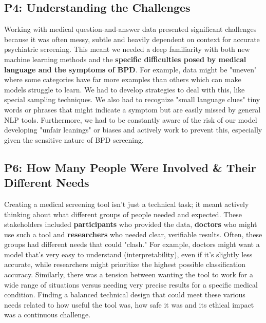 \subsection{P4: Understanding the Challenges}
Working with medical question-and-answer data presented significant challenges because it was often messy, subtle and heavily dependent on context for accurate psychiatric screening. This meant we needed a deep familiarity with both new machine learning methods and the \textbf{specific difficulties posed by medical language and the symptoms of BPD}. For example, data might be "uneven" where some categories have far more examples than others which can make models struggle to learn. We had to develop strategies to deal with this, like special sampling techniques. We also had to recognize "small language clues" tiny words or phrases that might indicate a symptom but are easily missed by general NLP tools. Furthermore, we had to be constantly aware of the risk of our model developing "unfair leanings" or biases and actively work to prevent this, especially given the sensitive nature of BPD screening.

\subsection{P6: How Many People Were Involved \& Their Different Needs}
Creating a medical screening tool isn't just a technical task; it meant actively thinking about what different groups of people needed and expected. These stakeholders included \textbf{participants} who provided the data, \textbf{doctors} who might use such a tool and \textbf{researchers} who needed clear, verifiable results. Often, these groups had different needs that could "clash." For example, doctors might want a model that's very easy to understand (interpretability), even if it's slightly less accurate, while researchers might prioritize the highest possible classification accuracy. Similarly, there was a tension between wanting the tool to work for a wide range of situations versus needing very precise results for a specific medical condition. Finding a balanced technical design that could meet these various needs related to how useful the tool was, how safe it was and its ethical impact was a continuous challenge.

